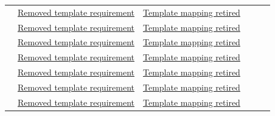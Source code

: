 \begin{landscape}
\begin{tabularx}{\linewidth}{YYYYYY}
 & \hyperref[Section:RetiredTemplateRequirements]{Removed template requirement} & \hyperref[Section:RetiredTemplateUseCases]{Template mapping retired} &  &  & \\
 & \hyperref[Section:RetiredTemplateRequirements]{Removed template requirement} & \hyperref[Section:RetiredTemplateUseCases]{Template mapping retired} &  &  & \\
 & \hyperref[Section:RetiredTemplateRequirements]{Removed template requirement} & \hyperref[Section:RetiredTemplateUseCases]{Template mapping retired} &  &  & \\
 & \hyperref[Section:RetiredTemplateRequirements]{Removed template requirement} & \hyperref[Section:RetiredTemplateUseCases]{Template mapping retired} &  &  & \\
 & \hyperref[Section:RetiredTemplateRequirements]{Removed template requirement} & \hyperref[Section:RetiredTemplateUseCases]{Template mapping retired} &  &  & \\
 & \hyperref[Section:RetiredTemplateRequirements]{Removed template requirement} & \hyperref[Section:RetiredTemplateUseCases]{Template mapping retired} &  &  & \\
 & \hyperref[Section:RetiredTemplateRequirements]{Removed template requirement} & \hyperref[Section:RetiredTemplateUseCases]{Template mapping retired} &  &  & \\
\end{tabularx}
\end{landscape}
